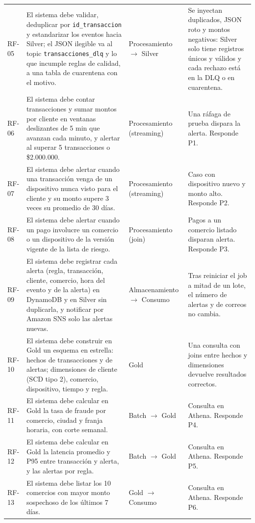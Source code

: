 \documentclass[12pt,letterpaper]{article}
\newcommand{\code}[1]{{\small\texttt{#1}}}
\begin{document}
\begin{footnotesize}
\begin{longtable}{@{}P{0.45in}P{2.85in}P{0.95in}P{2.05in}@{}}
RF-05 & El sistema debe validar, deduplicar por \code{id\_transaccion} y estandarizar los eventos hacia Silver; el JSON ilegible va al topic \code{transacciones\_dlq} y lo que incumple reglas de calidad, a una tabla de cuarentena con el motivo. & Procesamiento $\rightarrow$ Silver & Se inyectan duplicados, JSON roto y montos negativos: Silver solo tiene registros únicos y válidos y cada rechazo está en la DLQ o en cuarentena.\\[1pt]
RF-06 & El sistema debe contar transacciones y sumar montos por cliente en ventanas deslizantes de 5 min que avanzan cada minuto, y alertar al superar 5 transacciones o \$2.000.000. & Procesamiento (streaming) & Una ráfaga de prueba dispara la alerta. Responde P1.\\[1pt]
RF-07 & El sistema debe alertar cuando una transacción venga de un dispositivo nunca visto para el cliente y su monto supere 3 veces su promedio de 30 días. & Procesamiento (streaming) & Caso con dispositivo nuevo y monto alto. Responde P2.\\[1pt]
RF-08 & El sistema debe alertar cuando un pago involucre un comercio o un dispositivo de la versión vigente de la lista de riesgo. & Procesamiento (join) & Pagos a un comercio listado disparan alerta. Responde P3.\\[1pt]
RF-09 & El sistema debe registrar cada alerta (regla, transacción, cliente, comercio, hora del evento y de la alerta) en DynamoDB y en Silver sin duplicarla, y notificar por Amazon SNS solo las alertas nuevas. & Almacenamiento $\rightarrow$ Consumo & Tras reiniciar el job a mitad de un lote, el número de alertas y de correos no cambia.\\[1pt]
RF-10 & El sistema debe construir en Gold un esquema en estrella: hechos de transacciones y de alertas; dimensiones de cliente (SCD tipo 2), comercio, dispositivo, tiempo y regla. & Gold & Una consulta con joins entre hechos y dimensiones devuelve resultados correctos.\\[1pt]
RF-11 & El sistema debe calcular en Gold la tasa de fraude por comercio, ciudad y franja horaria, con corte semanal. & Batch $\rightarrow$ Gold & Consulta en Athena. Responde P4.\\[1pt]
RF-12 & El sistema debe calcular en Gold la latencia promedio y P95 entre transacción y alerta, y las alertas por regla. & Batch $\rightarrow$ Gold & Consulta en Athena. Responde P5.\\[1pt]
RF-13 & El sistema debe listar los 10 comercios con mayor monto sospechoso de los últimos 7 días. & Gold $\rightarrow$ Consumo & Consulta en Athena. Responde P6.\\[1pt]

\end{longtable}
\end{footnotesize}
\end{document}

